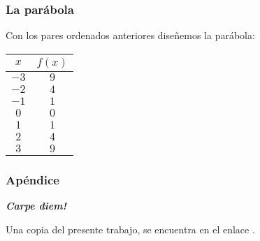 \documentclass[12pt,spanish,x11names]{beamer}
\def\talktitle{La Función Cuadrática}
\def\talkpubpdf{https://github.com/hsigrist/LMLA/blob/master/3TP/TALKS/FUNCION-CUADRATICA.pdf}
\newcommand{\framedhref}[2]{\href{#1}{\fcolorbox{bluu}{bluu}{\textcolor{white}{#2}}}}
\begin{document}
\begin{frame}
  \frametitle{La parábola}
  Con los pares ordenados anteriores diseñemos la parábola:
    \begin{minipage}[t]{.6\linewidth}
     \begin{figure}[h]
      \centering
    \end{figure}
  \end{minipage}
  \begin{minipage}[t]{.3\linewidth}
  \begin{tabular}[t]{|c|c|}
    \hline
    $x$ & $f(x)$\\
    \hline
    $-3$ & $9$\\      
    \hline
    $-2$ & $4$\\      
    \hline
    $-1$ & $1$\\      
    \hline
    $0$ & $0$\\      
    \hline
    $1$ & $1$\\      
    \hline
    $2$ & $4$\\      
    \hline
    $3$ & $9$\\      
    \hline
  \end{tabular}
  \end{minipage}

\end{frame}



























\begin{frame}[c]\frametitle{Apéndice}
\centering\decofourleft\quad\decofourright

\textbf{\emph {Carpe diem!}}

Una copia del presente trabajo, se encuentra en el enlace \framedhref{\talkpubpdf}{\talktitle}.

\end{frame}
\end{document}
